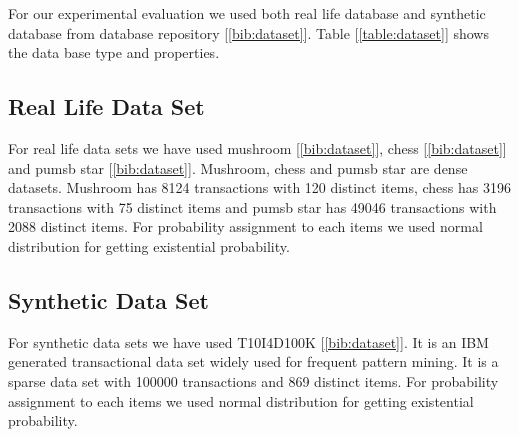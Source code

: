 %
For our experimental evaluation we used both real life database and synthetic database from database repository [\ref{bib:dataset}]. Table [\ref{table:dataset}] shows the data base type and properties.

\subsection{Real Life Data Set}
For real life data sets we have used mushroom [\ref{bib:dataset}], chess [\ref{bib:dataset}] and pumsb star [\ref{bib:dataset}]. Mushroom, chess and pumsb star are dense datasets. Mushroom has 8124 transactions with 120 distinct items, chess has 3196 transactions with 75 distinct items and pumsb star has 49046 transactions with 2088 distinct items. For probability assignment to each items we used normal distribution for getting existential probability.
\subsection{Synthetic Data Set}
For synthetic data sets we have used T10I4D100K [\ref{bib:dataset}]. It is an IBM generated transactional data set widely used for frequent pattern mining. It is a sparse data set with 100000 transactions and 869 distinct items. For probability assignment to each items we used normal distribution for getting existential probability.




%